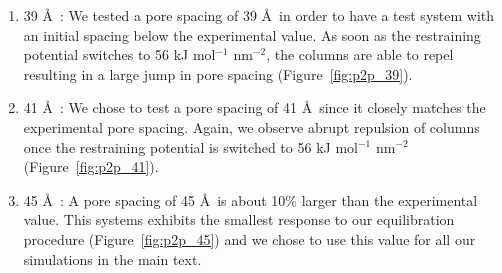 \documentclass{article}
\begin{document}

	\begin{enumerate}

	\item 39 \AA~: We tested a pore spacing of 39 \AA~in order to
	have a test system with an initial spacing below the experimental value. As soon
	as the restraining potential switches to 56 kJ mol$^{-1}$ nm$^{-2}$, the
	columns are able to repel resulting in a large jump in pore spacing
	(Figure~\ref{fig:p2p_39}). %

		\item 41 \AA~: We chose to test a pore spacing of 41 \AA~since
	it closely matches the experimental pore spacing. Again, we observe abrupt
	repulsion of columns once the restraining potential is switched to 56 kJ
	mol$^{-1}$ nm$^{-2}$ (Figure~\ref{fig:p2p_41}). %

		\item 45 \AA~: A pore spacing of 45 \AA~is about 10\% larger
	than the experimental value. This systems exhibits the smallest response to our 
 		equilibration procedure (Figure~\ref{fig:p2p_45}) and we chose to use this
        value for all our simulations in the main text.


\end{enumerate}
\end{document}
